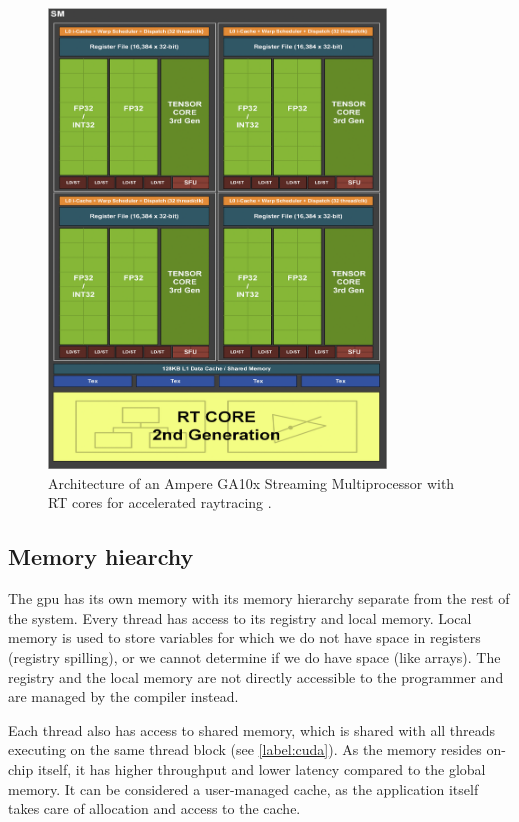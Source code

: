 \begin{figure}[H]
  \centering
  \includegraphics[width=0.8\textwidth ]{components/figure/ampere-sm.png}
  \caption[Architecture of an Ampere GA10x Streaming Multiprocessor]{Architecture of an Ampere GA10x Streaming Multiprocessor with RT cores for accelerated raytracing \cite{nvidiaampere}.}
  \label{figure:ampere-sm}
\end{figure}

\subsection{Memory hiearchy} \label{label:gpu:mem}

The \acrshort{gpu} has its own memory with its memory hierarchy separate from the rest of the system. Every thread has access to its registry and local memory. Local memory is used to store variables for which we do not have space in registers (registry spilling), or we cannot determine if we do have space (like arrays). The registry and the local memory are not directly accessible to the programmer and are managed by the compiler instead.

Each thread also has access to shared memory, which is shared with all threads executing on the same thread block (see \cref{label:cuda}). As the memory resides on-chip itself, it has higher throughput and lower latency compared to the global memory. It can be considered a user-managed cache, as the application itself takes care of allocation and access to the cache.

